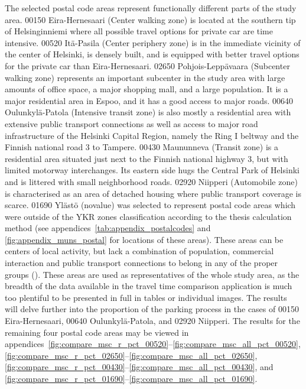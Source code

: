 The selected postal code areas represent functionally different parts of the study area. 00150 Eira-Hernesaari (Center walking zone) is located at the southern tip of Helsinginniemi where all possible travel options for private car are time intensive. 00520 Itä-Pasila (Center periphery zone) is in the immediate vicinity of the center of Helsinki, is densely built, and is equipped with better travel options for the private car than Eira-Hernesaari. 02650 Pohjois-Leppävaara (Subcenter walking zone) represents an important subcenter in the study area with large amounts of office space, a major shopping mall, and a large population. It is a major residential area in Espoo, and it has a good access to major roads. 00640 Oulunkylä-Patola (Intensive transit zone) is also mostly a residential area with extensive public transport connections as well as access to major road infrastructure of the Helsinki Capital Region, namely the Ring I beltway and the Finnish national road 3 to Tampere. 00430 Maununneva (Transit zone) is a residential area situated just next to the Finnish national highway 3, but with limited motorway interchanges. Its eastern side hugs the Central Park of Helsinki and is littered with small neighborhood roads. 02920 Niipperi (Automobile zone) is characterised as an area of detached housing where public transport coverage is scarce. 01690 Ylästö (novalue) was selected to represent postal code areas which were outside of the YKR zones classification according to the thesis calculation method (see appendices~\ref{tab:appendix_postalcodes} and \ref{fig:appendix_muns_postal} for locations of these areas). These areas can be centers of local activity, but lack a combination of population, commercial interaction and public transport connections to belong in any of the proper  groups (\cite{Ristimaki2017}). These areas are used as representatives of the whole study area, as the breadth of the data available in the travel time comparison application is much too plentiful to be presented in full in tables or individual images. The results will delve further into the proportion of the parking process in the cases of 00150 Eira-Hernesaari, 00640 Oulunkylä-Patola, and 02920 Niipperi. The results for the remaining four postal code areas may be viewed in appendices~\ref{fig:compare_msc_r_pct_00520}--\ref{fig:compare_msc_all_pct_00520}, \ref{fig:compare_msc_r_pct_02650}--\ref{fig:compare_msc_all_pct_02650}, \ref{fig:compare_msc_r_pct_00430}--\ref{fig:compare_msc_all_pct_00430}, and \ref{fig:compare_msc_r_pct_01690}--\ref{fig:compare_msc_all_pct_01690}.

